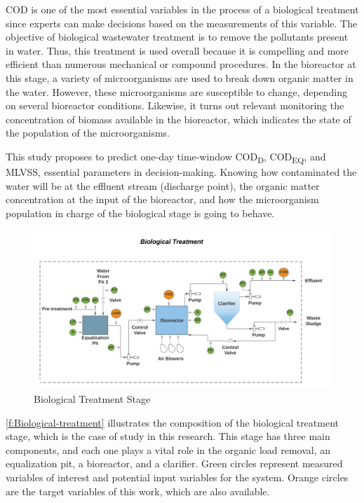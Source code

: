 \ac{COD} is one of the most essential variables in the process of a biological treatment since experts can make decisions based on the measurements of this variable. The objective of biological wastewater treatment is to remove the pollutants present in water. Thus, this treatment is used overall because it is compelling and more efficient than numerous mechanical or compound procedures. In the bioreactor at this stage, a variety of microorganisms are used to break down organic matter in the water. However, these microorganisms are susceptible to change, depending on several bioreactor conditions. Likewise, it turns out relevant monitoring the concentration of biomass available in the bioreactor, which indicates the state of the population of the microorganisms.

This study proposes to predict one-day time-window \ac{COD}\textsubscript{D}, \ac{COD}\textsubscript{EQ}, and \ac{MLVSS}, essential parameters in decision-making. Knowing how contaminated the water will be at the effluent stream (discharge point), the organic matter concentration at the input of the bioreactor, and how the microorganism population in charge of the biological stage is going to behave. 

\begin{figure}[h]
\centering
\includegraphics[width=\linewidth]{figures/Ch4/Biological-treatment-stage.png}
\caption{Biological Treatment Stage}
\label{f:Biological-treatment}
\end{figure}

\autoref{f:Biological-treatment} illustrates the composition of the biological treatment stage, which is the case of study in this research. This stage has three main components, and each one plays a vital role in the organic load removal, an equalization pit, a bioreactor, and a clarifier. Green circles represent measured variables of interest and potential input variables for the system. Orange circles are the target variables of this work, which are also available.

